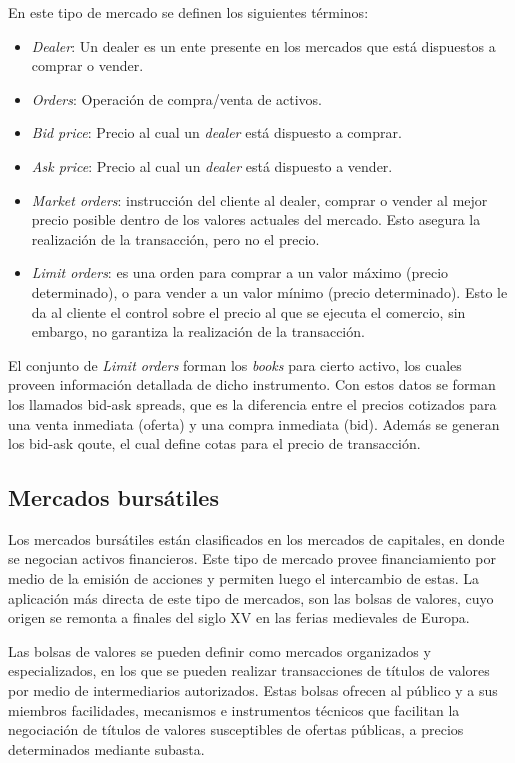 En este tipo de mercado se definen los siguientes términos:
\begin{itemize}
	\item \emph{Dealer}: Un dealer es un ente presente en los mercados que está dispuestos a comprar o vender.
	\item \emph{Orders}: Operación de compra/venta de activos.
	\item \emph{Bid price}: Precio al cual un \emph{dealer} está dispuesto a comprar.
	\item \emph{Ask price}: Precio al cual un \emph{dealer} está dispuesto a vender.
	\item \emph{Market orders}: instrucción del cliente al dealer, comprar o vender al mejor precio posible dentro de los valores actuales del mercado.
		Esto asegura la realización de la transacción, pero no el precio.
	\item \emph{Limit orders}: es una orden para comprar a un valor máximo (precio determinado), o para vender a un valor mínimo (precio determinado).
		Esto le da al cliente el control sobre el precio al que se ejecuta el comercio, sin embargo, no garantiza la realización de la transacción.
\end{itemize}

El conjunto de \emph{Limit orders} forman los \emph{books} para cierto activo, los cuales proveen información detallada de dicho instrumento. Con estos datos
se forman los llamados bid-ask spreads, que es la diferencia entre el precios cotizados para una venta inmediata (oferta) y una compra inmediata (bid). 
Además se generan los bid-ask qoute, el cual define cotas para el precio de transacción.

\subsection{Mercados bursátiles}
Los mercados bursátiles están clasificados en los mercados de capitales, en donde se negocian activos financieros. Este tipo de mercado provee financiamiento
por medio de la emisión de acciones y permiten luego el intercambio de estas. La aplicación más directa de este tipo de mercados, son las bolsas de valores, cuyo
origen se remonta a finales del siglo XV en las ferias medievales de Europa.

Las bolsas de valores se pueden definir como mercados organizados y especializados, en los que se pueden realizar transacciones de títulos de valores por
medio de intermediarios autorizados. Estas bolsas ofrecen al público y a sus miembros facilidades, mecanismos e instrumentos técnicos que facilitan la negociación
de títulos de valores susceptibles de ofertas públicas, a precios determinados mediante subasta.

